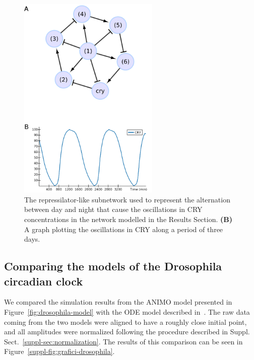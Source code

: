 \documentclass{bmcart}
\begin{document}
\begin{figure}[!htb]
\begin{minipage}{\textwidth}
  \centering
  \includegraphics[width=0.6\textwidth]{Figures/S5}
\caption{ The repressilator-like subnetwork used to represent the alternation
between day and night that cause the oscillations in {\sf CRY} concentrations in the
network modelled in the Results Section.
{\bf (B)} A graph plotting the oscillations in {\sf CRY} along
a period of three days.}\label{fig:repressilator}
\end{minipage}
\end{figure}


\subsection{Comparing the models of the Drosophila circadian clock}\label{suppl-sec:animo-drosophila}
We compared the simulation results from the ANIMO model presented in Figure~\ref{fig:drosophila-model}
with the ODE model described in~\cite{drosophila-ode-model}. The raw data coming from the
two models were aligned to have a roughly close initial point, and all amplitudes were normalized
following the procedure described in Suppl. Sect.~\ref{suppl-sec:normalization}. The results
of this comparison can be seen in Figure~\ref{suppl-fig:grafici-drosophila}.
\end{document}
